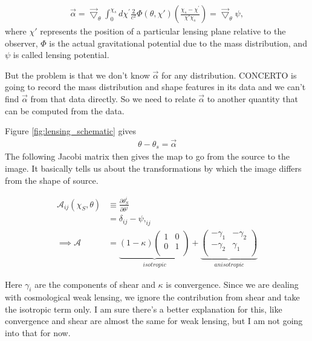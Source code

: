 \documentclass[12pt]{article}
\numberwithin{equation}{section}
\begin{document}
\begin{align}
\vec{\alpha} =  \vec{\bigtriangledown}_{\theta}  \int_{0}^{\chi_s} d\chi^{\prime} \frac{2}{c^2}\Phi(\theta, \chi') \left(\frac{\chi_s - \chi^{\prime}}{\chi'  \chi_s}\right)  = \vec{\bigtriangledown}_{\theta} \psi, \label{eq:deflection_angle}
\end{align}
where $ \chi' $ represents the position of a particular lensing plane relative to the observer, $\Phi$ is the actual gravitational potential due to the mass distribution, and $\psi$ is called lensing potential.

But the problem is that we don't know $ \vec{\alpha} $ for any distribution. CONCERTO is going to record the mass distribution and shape features in its data and we can't find $ \vec{\alpha} $ from that data directly. So we need to relate $ \vec{\alpha} $ to another quantity that can be computed from the data.

Figure \ref{fig:lensing_schematic} gives
\begin{align}
\theta - \theta_s =  \vec{\alpha}
\end{align}
The following Jacobi matrix then gives the map to go from the source to the image. It basically tells us about the transformations by which the image differs from the shape of source.


\begin{align}
\mathcal{A}_{ij}(\chi_S, \theta) &\equiv \frac{\partial\theta_S^i}{\partial\theta^j} \\ 
&= \delta_{ij} - \psi,_{ij} \\
\implies
\mathcal{A} &= \underbrace{(1-\kappa) 
	\begin{pmatrix}
	1 & 0 \\
	0 & 1 \\
	\end{pmatrix}}_{isotropic}
+
\underbrace{
	\begin{pmatrix}
	- \gamma_1 & -\gamma_{2} \\
	-\gamma_{2} & \gamma_1 \\
	\end{pmatrix} 
}_{anisotropic} \label{eq:jacobi}
\end{align}

Here $\gamma_i$ are the components of shear and $ \kappa $ is convergence. Since we are dealing with cosmological weak lensing, we ignore the contribution from shear and take the isotropic term only. I am sure there's a better explanation for this, like convergence and shear are almost the same for weak lensing, but I am not going into that for now.
\end{document}
